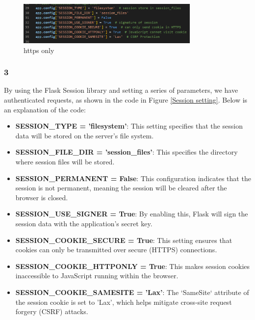 \documentclass[12pt]{article}
\begin{document}
    	\begin{figure}[H]
            \centering
            \includegraphics[width=0.8\textwidth]{zzrgraphs/cookie_secure_https_only.png}
            \caption{https only}
    		\label{httpsonly}
        \end{figure}


    \subsubsection*{3}

          By using the Flask Session library and setting a series of parameters, we have authenticated requests, as shown in the code in Figure \ref{Session setting}. Below is an explanation of the code:


        \begin{itemize}
            \item \textbf{SESSION\_TYPE = 'filesystem'}: This setting specifies that the session data will be stored on the server's file system.

            \item \textbf{SESSION\_FILE\_DIR = 'session\_files'}: This specifies the directory where session files will be stored. 

            \item \textbf{SESSION\_PERMANENT = False}: This configuration indicates that the session is not permanent, meaning the session will be cleared after the browser is closed.

            \item \textbf{SESSION\_USE\_SIGNER = True}: By enabling this, Flask will sign the session data with the application's secret key.

            \item \textbf{SESSION\_COOKIE\_SECURE = True}: This setting ensures that cookies can only be transmitted over secure (HTTPS) connections. 

            \item \textbf{SESSION\_COOKIE\_HTTPONLY = True}: This makes session cookies inaccessible to JavaScript running within the browser. 

            \item \textbf{SESSION\_COOKIE\_SAMESITE = 'Lax'}: The `SameSite` attribute of the session cookie is set to 'Lax', which helps mitigate cross-site request forgery (CSRF) attacks. 
        \end{itemize}
\end{document}
